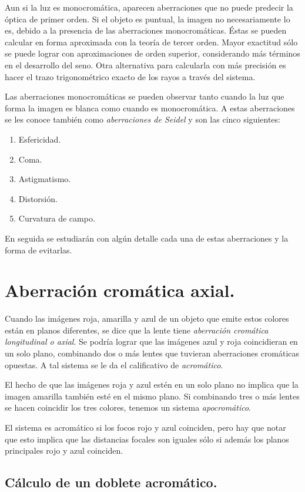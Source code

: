 \documentclass[14pt]{extarticle}
\begin{document}
Aun si la luz es monocromática, aparecen aberraciones que no puede predecir la óptica de primer orden. Si el objeto es puntual, la imagen no necesariamente lo es, debido a la presencia de las aberraciones monocromáticas. Éstas se pueden calcular en forma aproximada con la teoría de tercer orden. Mayor exactitud sólo se puede lograr con aproximaciones de orden superior, considerando más términos en el desarrollo del seno. Otra alternativa para calcularla con más precisión es hacer el trazo trigonométrico exacto de los rayos a través del sistema.

Las aberraciones monocromáticas se pueden observar tanto cuando la luz que forma la imagen es blanca como cuando es monocromática. A estas aberraciones se les conoce también como \textit{aberraciones de Seidel} y son las cinco siguientes:
\begin{enumerate}[label=\roman*)]
\item Esfericidad.
\item Coma.
\item Astigmatismo.
\item Distorsión.
\item Curvatura de campo.
\end{enumerate}
En seguida se estudiarán con algún detalle cada una de estas aberraciones y la forma de evitarlas.

\section{Aberración cromática axial.}

Cuando las imágenes roja, amarilla y azul de un objeto que emite estos colores están en planos diferentes, se dice que la lente tiene \textit{aberración cromática longitudinal o axial}. Se podría lograr que las imágenes azul y roja coincidieran en un solo plano, combinando dos o más lentes que tuvieran aberraciones cromáticas opuestas. A tal sistema se le da el calificativo de \textit{acromático}.

El hecho de que las imágenes roja y azul estén en un solo plano no implica que la imagen amarilla también esté en el mismo plano. Si combinando tres o más lentes se hacen coincidir los tres colores, tenemos un sistema \textit{apocromático}.

El sistema es acromático si los focos rojo y azul coinciden, pero hay que notar que esto implica que las distancias focales son iguales sólo si además los planos principales rojo y azul coinciden.

\subsection{Cálculo de un doblete acromático.}
\end{document}
